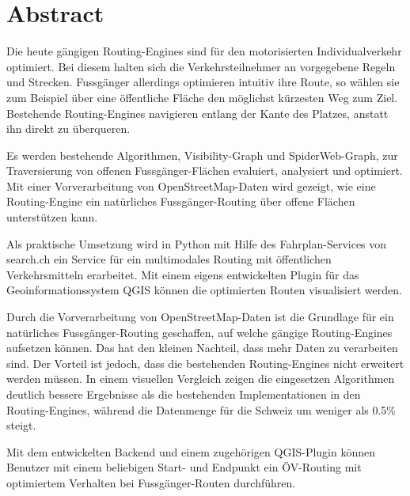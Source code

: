 
\chapter*{Abstract}

Die heute gängigen Routing-Engines sind für den motorisierten Individualverkehr optimiert. Bei diesem halten sich die Verkehrsteilnehmer an vorgegebene Regeln und Strecken. Fussgänger allerdings optimieren intuitiv ihre Route, so wählen sie zum Beispiel über eine öffentliche Fläche den möglichst kürzesten Weg zum Ziel. Bestehende Routing-Engines navigieren entlang der Kante des Platzes, anstatt ihn direkt zu überqueren.

Es werden bestehende Algorithmen, Visibility-Graph und SpiderWeb-Graph, zur Traversierung von offenen Fussgänger-Flächen evaluiert, analysiert und optimiert. Mit einer Vorverarbeitung von OpenStreetMap-Daten wird gezeigt, wie eine Routing-Engine ein natürliches Fussgänger-Routing über offene Flächen unterstützen kann.

Als praktische Umsetzung wird in Python mit Hilfe des Fahrplan-Services von search.ch ein Service für ein multimodales Routing mit öffentlichen Verkehrsmitteln erarbeitet. Mit einem eigens entwickelten Plugin für das Geoinformationssystem QGIS können die optimierten Routen visualisiert werden.

Durch die Vorverarbeitung von OpenStreetMap-Daten ist die Grundlage für ein natürliches Fussgänger-Routing geschaffen, auf welche gängige Routing-Engines aufsetzen können. Das hat den kleinen Nachteil, dass mehr Daten zu verarbeiten sind. Der Vorteil ist jedoch, dass die bestehenden Routing-Engines nicht erweitert werden müssen. In einem visuellen Vergleich zeigen die eingesetzen Algorithmen  deutlich bessere Ergebnisse als die bestehenden Implementationen in den Routing-Engines, während die Datenmenge für die Schweiz um weniger als 0.5\% steigt.

Mit dem entwickelten Backend und einem zugehörigen QGIS-Plugin können Benutzer mit einem beliebigen Start- und Endpunkt ein ÖV-Routing mit optimiertem Verhalten bei Fussgänger-Routen durchführen.

\cleardoublepage

